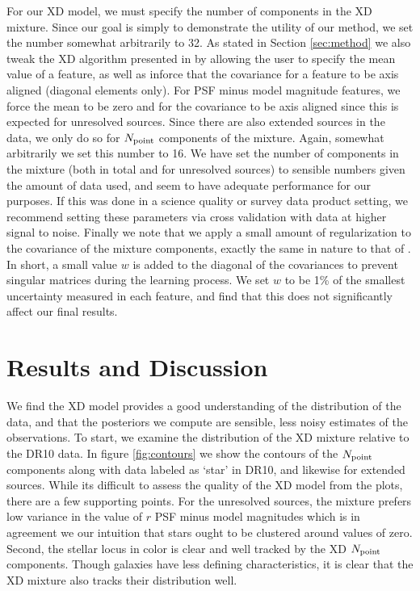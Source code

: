 \documentclass[12pt,preprint]{aastex}
\begin{document}
For our XD model, we must specify the number of components in the XD mixture.
Since our goal is simply to demonstrate the utility of our method, we set the 
number somewhat arbitrarily to 32.  
As stated in Section \ref{sec:method} we also tweak the XD algorithm
presented in
\citet{bovy11} by allowing the user to specify the mean value of a feature,
as well as inforce that the covariance for a feature to be axis aligned
(diagonal elements only).  For PSF minus model magnitude features, we force
the mean to be zero and for the covariance to be axis aligned since this is
expected for unresolved sources. Since there are also extended sources in the
data, we only do so for $N_{\rm point}$ components of the mixture.  Again,
somewhat arbitrarily we set this number to 16.  We have set the number of
components in the mixture (both in total and for unresolved sources) to
sensible numbers given the amount of data used, and seem to have adequate
performance for our purposes.  If this was done in a science quality or
survey data product setting, we recommend setting these parameters via cross
validation with data at higher signal to noise.  Finally we note that we 
apply a small amount of regularization to the covariance of the mixture
components, exactly the same in nature to that of \citet{bovy09}.  In short, 
a small value $w$ is added to the diagonal of the covariances to prevent
singular matrices during the learning process.  We set $w$ to be 1\% of the 
smallest uncertainty measured in each feature, and find that this does not
significantly affect our final results.

\section{Results and Discussion}
\label{sec:results}

We find the XD model provides a good understanding of the distribution of the 
data, and that the posteriors we compute are sensible, less noisy estimates of 
the observations.  To start, we examine the distribution of the XD mixture 
relative to the DR10 data.  In figure \ref{fig:contours} we show the contours 
of the $N_{\rm point}$ components along with data labeled as `star' in DR10,
and likewise for extended sources.  While its difficult to assess the quality
of the XD model from the plots, there are a few supporting points.  For the 
unresolved sources, the mixture prefers low variance in the value of $r$ PSF
minus model magnitudes which is in agreement we our intuition that stars
ought to be clustered around values of zero.  Second, the stellar locus in
color is clear and well tracked by the XD $N_{\rm point}$ components.  Though 
galaxies have less defining characteristics, it is clear that the XD mixture 
also tracks their distribution well.
\end{document}
